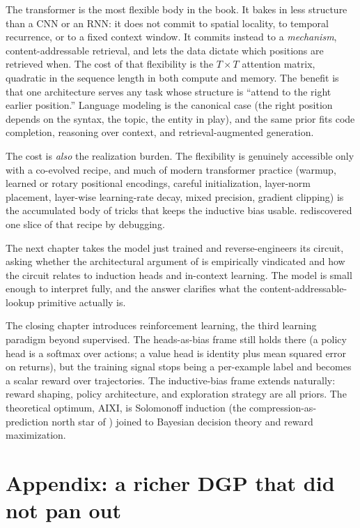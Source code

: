 The transformer is the most flexible body in the book. It bakes in less
structure than a CNN or an RNN: it does not commit to spatial locality,
to temporal recurrence, or to a fixed context window. It commits instead
to a \emph{mechanism}, content-addressable retrieval, and lets the data
dictate which positions are retrieved when. The cost of that flexibility
is the $T \times T$ attention matrix, quadratic in the sequence length in
both compute and memory. The benefit is that one architecture serves any
task whose structure is ``attend to the right earlier position.''
Language modeling is the canonical case (the right position depends on
the syntax, the topic, the entity in play), and the same prior fits code
completion, reasoning over context, and retrieval-augmented generation.

The cost is \emph{also} the realization burden. The flexibility is
genuinely accessible only with a co-evolved recipe, and much of modern
transformer practice (warmup, learned or rotary positional encodings,
careful initialization, layer-norm placement, layer-wise learning-rate
decay, mixed precision, gradient clipping) is the accumulated body of
tricks that keeps the inductive bias usable. 
rediscovered one slice of that recipe by debugging.

The next chapter takes the model just trained and reverse-engineers its
circuit, asking whether the architectural argument of
 is empirically vindicated and how the circuit
relates to induction heads and in-context learning. The model is small
enough to interpret fully, and the answer clarifies what the
content-addressable-lookup primitive actually is.

The closing chapter introduces reinforcement learning, the third
learning paradigm beyond supervised. The heads-as-bias frame still holds
there (a policy head is a softmax over actions; a value head is identity
plus mean squared error on returns), but the training signal stops being
a per-example label and becomes a scalar reward over trajectories. The
inductive-bias frame extends naturally: reward shaping, policy
architecture, and exploration strategy are all priors. The theoretical
optimum, AIXI, is Solomonoff induction (the compression-as-prediction
north star of ) joined to Bayesian decision
theory and reward maximization.

\section*{Appendix: a richer DGP that did not pan out}\label{sec:richer-dgp}

